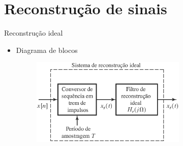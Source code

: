 

\section{Reconstrução de sinais}
\begin{slide}{Reconstrução ideal}
\begin{itemize}
   \item Diagrama de blocos
   \begin{figure}
      \centering
      \includegraphics[width=0.7\textwidth]{figs/reconstrblock.eps}
   \end{figure}
\end{itemize}
\end{slide}

